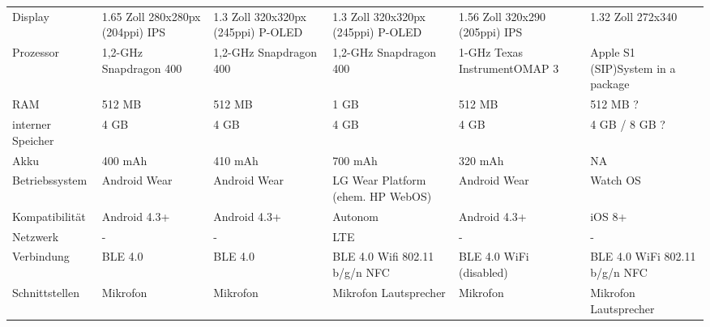 \begin{landscape}
\begin{longtable}{p{2.8cm}p{3.5cm}p{3.5cm}p{3.5cm}p{3.5cm}p{3.5cm}}
	Display
		& 1.65 Zoll \newline
			280x280px (204ppi) \newline
			IPS
		& 1.3 Zoll \newline
			320x320px (245ppi) \newline
			P-OLED
		& 1.3 Zoll \newline
			320x320px (245ppi) \newline
			P-OLED
		& 1.56 Zoll \newline
			320x290 (205ppi) \newline
			IPS
		& 1.32 Zoll \newline
			272x340 \\
	Prozessor
		& 1,2-GHz \newline Snapdragon 400
		& 1,2-GHz \newline Snapdragon 400
		& 1,2-GHz \newline Snapdragon 400
		& 1-GHz \newline Texas Instrument\newline OMAP 3
		& Apple S1 (SIP)\newline System in a package \\
	RAM
		& 512 MB
		& 512 MB
		& 1 GB
		& 512 MB
		& 512 MB ?\\
	interner Speicher
		& 4 GB
		& 4 GB
		& 4 GB
		& 4 GB
		& 4 GB / 8 GB ?\\
	Akku
		& 400 mAh
		& 410 mAh
		& 700 mAh
		& 320 mAh
		& NA\\
	Betriebssystem
		& Android Wear
		& Android Wear
		& LG Wear Platform \newline (ehem. HP WebOS)
		& Android Wear
		& Watch OS \\
	Kompatibilität
		& Android 4.3+
		& Android 4.3+
		& Autonom
		& Android 4.3+
		& iOS 8+\\
	Netzwerk
		& -
		& -
		& LTE
		& - 
		& -\\
	Verbindung
		& BLE 4.0
		& BLE 4.0
		& BLE 4.0 \newline
			Wifi 802.11 b/g/n \newline
			NFC
		& BLE 4.0 \newline
			WiFi (disabled)
		& BLE 4.0 \newline
			WiFi 802.11 b/g/n \newline
			NFC \\
	Schnittstellen
		& Mikrofon
		& Mikrofon
		& Mikrofon \newline
			Lautsprecher
		& Mikrofon
		& Mikrofon \newline
			Lautsprecher \\

\end{longtable}
\end{landscape}
